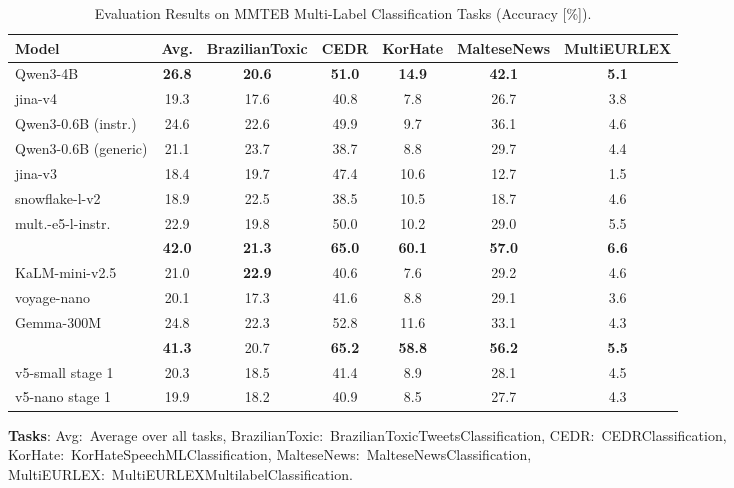 \documentclass[11pt]{article}
\begin{document}
\begin{table}[H]
\caption{Evaluation Results on MMTEB Multi-Label Classification Tasks (Accuracy [\%]).}
\label{tab:mteb_multilingual_multi_label_classification}
\centering
\small
\setlength{\tabcolsep}{3pt}
\begin{tabular}{l*{6}{c}}
\toprule
\textbf{Model} & \textbf{Avg.} & \textbf{BrazilianToxic} & \textbf{CEDR} & \textbf{KorHate} & \textbf{MalteseNews} & \textbf{MultiEURLEX} \\
\midrule
Qwen3-4B & \textbf{26.8} & \textbf{20.6} & \textbf{51.0} & \textbf{14.9} & \textbf{42.1} & \textbf{5.1} \\
jina-v4 & 19.3 & 17.6 & 40.8 & 7.8 & 26.7 & 3.8 \\
\midrule
Qwen3-0.6B (instr.) & 24.6 & 22.6 & 49.9 & 9.7 & 36.1 & 4.6 \\
Qwen3-0.6B (generic) & 21.1 & 23.7 & 38.7 & 8.8 & 29.7 & 4.4 \\
jina-v3 & 18.4 & 19.7 & 47.4 & 10.6 & 12.7 & 1.5 \\
snowflake-l-v2 & 18.9 & 22.5 & 38.5 & 10.5 & 18.7 & 4.6 \\
mult.-e5-l-instr. & 22.9 & 19.8 & 50.0 & 10.2 & 29.0 & 5.5 \\
\JEmbeddingVFiveTextSmallShort{} & \textbf{42.0} & \textbf{21.3} & \textbf{65.0} & \textbf{60.1} & \textbf{57.0} & \textbf{6.6} \\
\midrule
KaLM-mini-v2.5 & 21.0 & \textbf{22.9} & 40.6 & 7.6 & 29.2 & 4.6 \\
voyage-nano & 20.1 & 17.3 & 41.6 & 8.8 & 29.1 & 3.6 \\
Gemma-300M & 24.8 & 22.3 & 52.8 & 11.6 & 33.1 & 4.3 \\
\JEmbeddingVFiveTextNanoShort{} & \textbf{41.3} & 20.7 & \textbf{65.2} & \textbf{58.8} & \textbf{56.2} & \textbf{5.5} \\
\midrule
v5-small stage 1 & 20.3 & 18.5 & 41.4 & 8.9 & 28.1 & 4.5 \\
v5-nano stage 1 & 19.9 & 18.2 & 40.9 & 8.5 & 27.7 & 4.3 \\
\bottomrule
\end{tabular}
\begin{flushleft}
\textbf{Tasks}: Avg:~Average over all tasks, BrazilianToxic:~BrazilianToxicTweetsClassification, 
CEDR:~CEDRClassification, 
KorHate:~KorHateSpeechMLClassification, 
MalteseNews:~MalteseNewsClassification, 
MultiEURLEX:~MultiEURLEXMultilabelClassification.
\end{flushleft}
\end{table}
\end{document}
